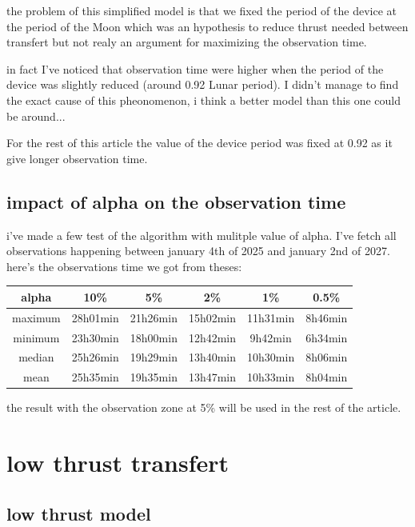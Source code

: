 \documentclass{article} %
\begin{document}
		the problem of this simplified model is that we fixed the period of the device at the period of the Moon which was an hypothesis to reduce thrust needed between transfert but not realy an argument for maximizing the observation time.
		
		in fact I've noticed that observation time were higher when the period of the device was slightly reduced (around 0.92 Lunar period). I didn't manage to find the exact cause of this pheonomenon, i think a better model than this one could be around...
		
		For the rest of this article the value of the device period was fixed at 0.92 as it give longer observation time. 
		
		\subsection{impact of alpha on the observation time}
		
		i've made a few test of the algorithm with mulitple value of alpha. I've fetch all observations happening between january 4th of 2025 and january 2nd of 2027. here's the observations time we got from theses:  
		\begin{center}
			\begin{tabular}{||c||c c c c c||} 
				\hline
				alpha & 10\% & 5\% & 2\% &1\% & 0.5\% \\ [0.5ex] 
				\hline\hline
				maximum & 28h01min & 21h26min & 15h02min &11h31min & 8h46min \\ 
				\hline
				minimum & 23h30min & 18h00min & 12h42min &9h42min& 6h34min \\
				\hline
				median & 25h26min & 19h29min & 13h40min &10h30min& 8h06min\\
				\hline
				mean & 25h35min & 19h35min & 13h47min &10h33min& 8h04min\\ 
				\hline
			\end{tabular}
		\end{center}
		
		the result with the observation zone at 5\% will be used in the rest of the article.
		
		\section{low thrust transfert}
			
			\subsection{low thrust model}
			
\end{document}
